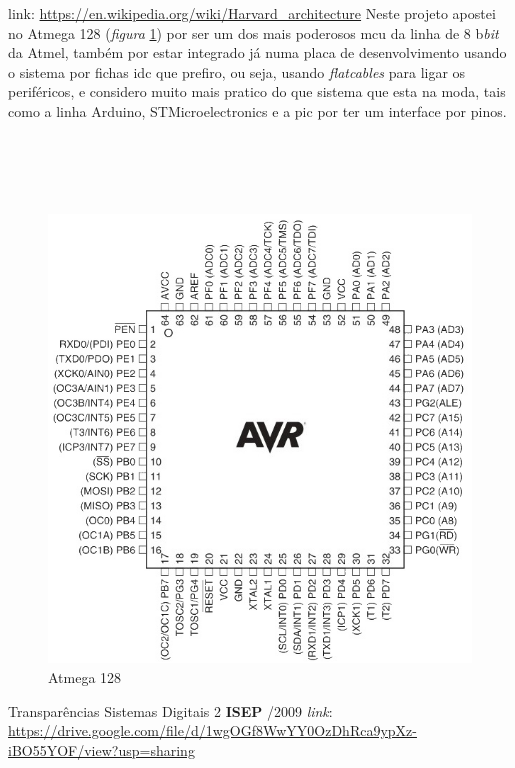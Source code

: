 \qquad link: \url{https://en.wikipedia.org/wiki/Harvard_architecture}
\newpage
Neste projeto apostei no Atmega 128 (\textit{figura} \ref{Atmega_128_pinagem}) por ser um dos mais poderosos \ac{mcu} da linha de 8 b\textit{bit} da Atmel, também por estar integrado já numa placa de desenvolvimento usando o sistema por fichas \ac{idc} que prefiro, ou seja, usando \textit{flatcables} para ligar os periféricos, e considero muito mais pratico do que sistema que esta na moda, tais como a linha Arduino, STMicroelectronics e a \ac{pic} por ter um interface por pinos.
\\
\\
\\
\\
\\
\begin{figure}[H]
	\centering
	\includegraphics[scale=0.7]{./image/PESTA/material/Atmega128_1.jpg}
	\caption{Atmega 128}
	\label{Atmega_128_pinagem}
\end{figure}
{Transparências Sistemas Digitais 2 \quad \textbf{ISEP} /2009 \quad \textit{link}}:
\\
\url{https://drive.google.com/file/d/1wgOGf8WwYY0OzDhRca9ypXz-iBO55YOF/view?usp=sharing}
